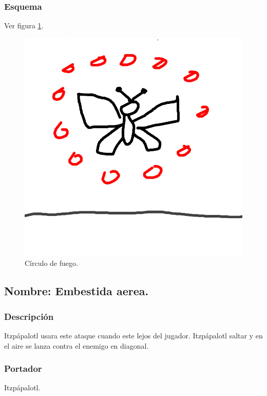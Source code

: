 \documentclass[11pt,letterpaper]{article}
\begin{document}
\subsubsection{Esquema}
			Ver figura \ref{fig:circuloF}.
			\begin{figure}
				\centering
				\includegraphics[height=0.2 \textheight]{Imagenes/circuloF}
				\caption{Círculo de fuego.}
				\label{fig:circuloF}
			\end{figure}
\subsection{Nombre: Embestida aerea.}
\subsubsection{Descripción}
Itzpápalotl usara este ataque cuando este lejos del jugador. Itzpápalotl saltar y en el aire se lanza contra el enemigo en diagonal.
\subsubsection{Portador}
Itzpápalotl.
\end{document}
